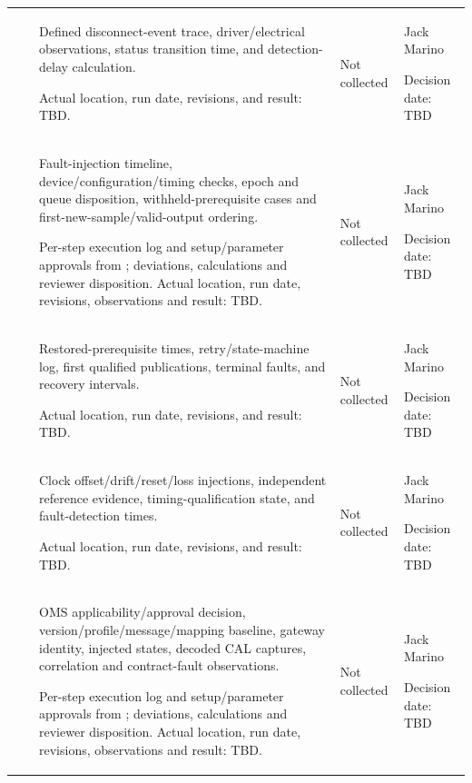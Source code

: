 \begin{landscape}
\begin{tabularx}{\linewidth}{L{2.0cm}L{3.3cm}Y L{2.3cm}L{2.6cm}}
 & \par {} & Defined disconnect-event trace, driver/electrical observations, status transition time, and detection-delay calculation.\par Actual location, run date, revisions, and result: TBD. & Not collected & Jack Marino\par Decision date: TBD\\
 & \par {} & Fault-injection timeline, device/configuration/timing checks, epoch and queue disposition, withheld-prerequisite cases and first-new-sample/valid-output ordering.\par Per-step execution log and setup/parameter approvals from ; deviations, calculations and reviewer disposition. Actual location, run date, revisions, observations and result: TBD. & Not collected & Jack Marino\par Decision date: TBD\\
 & \par {} & Restored-prerequisite times, retry/state-machine log, first qualified publications, terminal faults, and recovery intervals.\par Actual location, run date, revisions, and result: TBD. & Not collected & Jack Marino\par Decision date: TBD\\
 & \par {} & Clock offset/drift/reset/loss injections, independent reference evidence, timing-qualification state, and fault-detection times.\par Actual location, run date, revisions, and result: TBD. & Not collected & Jack Marino\par Decision date: TBD\\
 & \par {} & OMS applicability/approval decision, version/profile/message/mapping baseline, gateway identity, injected states, decoded CAL captures, correlation and contract-fault observations.\par Per-step execution log and setup/parameter approvals from ; deviations, calculations and reviewer disposition. Actual location, run date, revisions, observations and result: TBD. & Not collected & Jack Marino\par Decision date: TBD\\

\end{tabularx}
\end{landscape}
